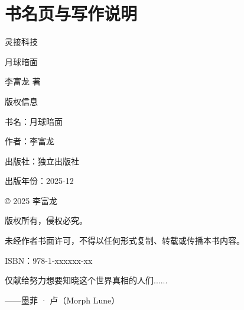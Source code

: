 \chapter*{书名页与写作说明}

灵接科技

月球暗面

李富龙 著

版权信息

书名：月球暗面

作者：李富龙

出版社：独立出版社

出版年份：2025-12

© 2025 李富龙

版权所有，侵权必究。

未经作者书面许可，不得以任何形式复制、转载或传播本书内容。

ISBN：978-1-xxxxxx-xx

仅献给努力想要知晓这个世界真相的人们......

——墨菲 · 卢（Morph Lune）
